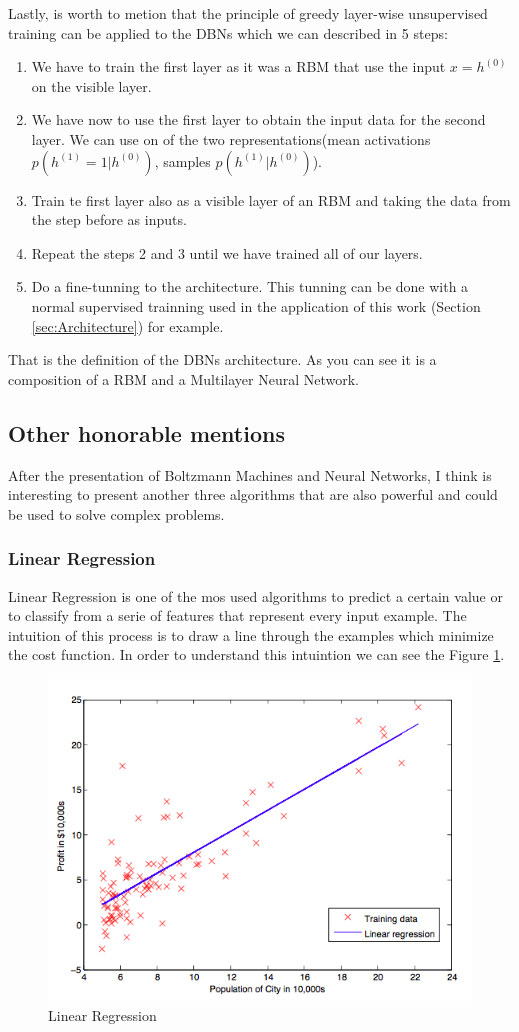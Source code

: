 \documentclass[12pt]{article}
\begin{document}
Lastly, is worth to metion that the principle of greedy layer-wise unsupervised training\cite{bengio2007greedy} can be applied to the DBNs which we can described in 5 steps:
\begin{enumerate}
\item We have to train the first layer as it was a RBM that use the input $x=h^{(0)}$ on the visible layer.
\item We have now to use the first layer to obtain the input data for the second layer. We can use on of the two representations(mean activations $p(h^{(1)}=1|h^{(0)})$, samples $p(h^{(1)}|h^{(0)})$).
\item Train te first layer also as a visible layer of an RBM and taking the data from the step before as inputs.
\item Repeat the steps 2 and 3 until we have trained all of our layers.
\item Do a fine-tunning to the architecture. This tunning can be done with a normal supervised trainning used in the application of this work (Section \ref{sec:Architecture}) for example.
\end{enumerate}
That is the definition of the DBNs architecture. As you can see it is a composition of a RBM and a Multilayer Neural Network.
\subsection{Other honorable mentions}
After the presentation of Boltzmann Machines and Neural Networks, I think is interesting to present another three algorithms that are also powerful and could be used to solve complex problems.

\subsubsection{Linear Regression}
Linear Regression is one of the mos used algorithms to predict a certain value or to classify from a serie of features that represent every input example. The intuition of this process is to draw a line through the examples which minimize the cost function. In order to understand this intuintion we can see the Figure \ref{fig:figure3}.

\begin{figure}[ht]
\centering
\includegraphics[width=.4\textwidth]{Regression.png}
\caption{Linear Regression}
\label{fig:figure3}
\end{figure}
\end{document}
